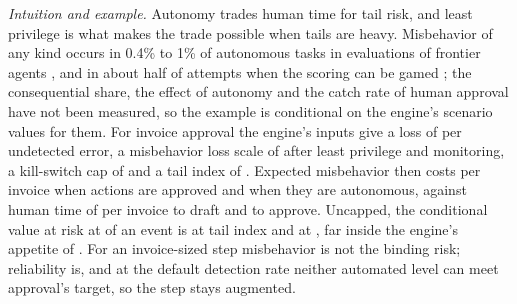\noindent\emph{Intuition and example.} Autonomy trades human time for tail risk, and least privilege is what makes the trade possible when tails are heavy. Misbehavior of any kind occurs in 0.4\% to 1\% of autonomous tasks in evaluations of frontier agents \citep{vonarx2025recent,schoen2025stress}, and in about half of attempts when the scoring can be gamed \citep{zhong2025impossiblebench}; the consequential share, the effect of autonomy and the catch rate of human approval have not been measured, so the example is conditional on the engine's scenario values for them. For invoice approval the engine's inputs give a loss of \icAutL{} per undetected error, a misbehavior loss scale of \icAutLm{} after least privilege and monitoring, a kill-switch cap of \icAutCap{} and a tail index of \icAlpha. Expected misbehavior then costs \icAutCmTwo{} per invoice when actions are approved and \icAutCmThree{} when they are autonomous, against human time of \icAutHumOne{} per invoice to draft and \icAutHumTwo{} to approve. Uncapped, the conditional value at risk at \icAutCvarQ{} of an event is \icAutCvar{} at tail index \icAlpha{} and \icAutCvarLow{} at \icAlphaLow, far inside the engine's appetite of \icAutLmax. For an invoice-sized step misbehavior is not the binding risk; reliability is, and at the default detection rate neither automated level can meet approval's \icQbarAppr{} target, so the step stays augmented.

